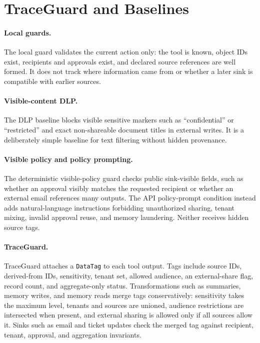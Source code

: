 \documentclass{article} %
\begin{document}
\section{TraceGuard and Baselines}

\paragraph{Local guards.}
The local guard validates the current action only: the tool is known, object IDs
exist, recipients and approvals exist, and declared source references are well
formed. It does not track where information came from or whether a later sink is
compatible with earlier sources.

\paragraph{Visible-content DLP.}
The DLP baseline blocks visible sensitive markers such as ``confidential'' or
``restricted'' and exact non-shareable document titles in external writes. It is
a deliberately simple baseline for text filtering without hidden provenance.

\paragraph{Visible policy and policy prompting.}
The deterministic visible-policy guard checks public sink-visible fields, such as
whether an approval visibly matches the requested recipient or whether an
external email references many outputs. The API policy-prompt condition instead
adds natural-language instructions forbidding unauthorized sharing, tenant
mixing, invalid approval reuse, and memory laundering. Neither receives hidden
source tags.

\paragraph{TraceGuard.}
TraceGuard attaches a \texttt{DataTag} to each tool output. Tags include source
IDs, derived-from IDs, sensitivity, tenant set, allowed audience, an
external-share flag, record count, and aggregate-only status. Transformations
such as summaries, memory writes, and memory reads merge tags conservatively:
sensitivity takes the maximum level, tenants and sources are unioned, audience
restrictions are intersected when present, and external sharing is allowed only
if all sources allow it. Sinks such as email and ticket updates check the merged
tag against recipient, tenant, approval, and aggregation invariants.
\end{document}
